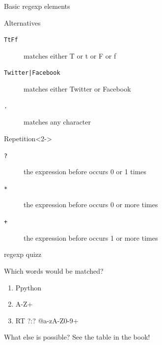 \begin{frame}{Basic regexp elements}
\begin{block}{Alternatives}
\begin{description}
\item[{\tt{\lbrack TtFf\rbrack}}] matches either T or t or F or f
\item[{\tt{Twitter|Facebook}}] matches either Twitter or Facebook
\item[{\tt{.}}] matches any character
\end{description}
\end{block}
\begin{block}{Repetition}<2->
\begin{description}
\item[{\tt{?}}] the expression before occurs 0 or 1 times
\item[{\tt{*}}] the expression before occurs 0 or more times
\item[{\tt{+}}] the expression before occurs 1 or more times
\end{description}
\end{block}
\end{frame}

\begin{frame}{regexp quizz}
\begin{block}{Which words would be matched?}
\tt
\begin{enumerate}
\item<1-> \lbrack Pp\rbrack ython
\item<2-> \lbrack A-Z\rbrack +
\item<3-> RT ?:? @\lbrack a-zA-Z0-9\rbrack +
\end{enumerate}
\end{block}
\end{frame}

\begin{frame}{What else is possible?}
See the table in the book!
\end{frame}

